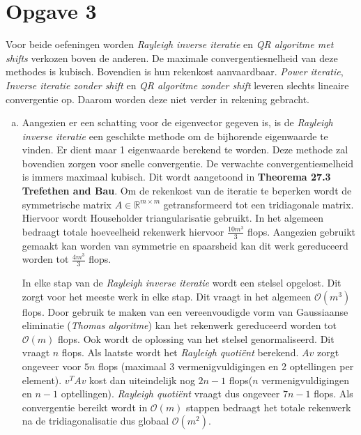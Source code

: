 \documentclass[a4paper]{article}
\newcommand{\opgave}[1]{\section*{Opgave #1}}
\begin{document}
\opgave{3}
Voor beide oefeningen worden \textit{Rayleigh inverse iteratie} en \textit{QR algoritme met shifts} verkozen boven de anderen. De maximale convergentiesnelheid van deze methodes is kubisch. Bovendien is hun rekenkost aanvaardbaar. \textit{Power iteratie}, \textit{Inverse iteratie zonder shift} en \textit{QR algoritme zonder shift} leveren slechts lineaire convergentie op. Daarom worden deze niet verder in rekening gebracht. 
\begin{enumerate}[a)] %
\item 
Aangezien er een schatting voor de eigenvector gegeven is, is de \textit{Rayleigh inverse iteratie} een geschikte methode om de bijhorende eigenwaarde te vinden. Er dient maar 1 eigenwaarde berekend te worden. Deze methode zal bovendien zorgen voor snelle convergentie. De verwachte convergentiesnelheid is immers maximaal kubisch. Dit wordt aangetoond in \textbf{Theorema 27.3 Trefethen and Bau}. Om de rekenkost van de iteratie te beperken wordt de symmetrische matrix $A \in \mathbb{R}^{m\times m}$ getransformeerd tot een tridiagonale matrix. Hiervoor wordt Householder triangularisatie gebruikt. In het algemeen bedraagt totale hoeveelheid rekenwerk hiervoor  $\frac{10m^{3}}{3}$ flops. Aangezien gebruikt gemaakt kan worden van symmetrie en spaarsheid kan dit werk gereduceerd worden tot $\frac{4m^{3}}{3}$ flops. 

In elke stap van de \textit{Rayleigh inverse iteratie} wordt een stelsel opgelost. Dit zorgt voor het meeste werk in elke stap. Dit vraagt in het algemeen $\mathcal{O} (m^3)$ flops. Door gebruik te maken van een vereenvoudigde vorm van Gaussiaanse eliminatie (\textit{Thomas algoritme}) kan het rekenwerk gereduceerd worden tot $\mathcal{O}(m)$ flops. Ook wordt de oplossing van het stelsel genormaliseerd. Dit vraagt $n$ flops. Als laatste wordt het \textit{Rayleigh quoti\"ent} berekend. $Av$ zorgt ongeveer voor $5n$ flops (maximaal 3 vermenigvuldigingen en 2 optellingen per element). $v^{T}Av$ kost dan uiteindelijk nog $2n-1$ flops($n$ vermenigvuldigingen en $n-1$ optellingen). \textit{Rayleigh quoti\"ent} vraagt dus ongeveer $7n-1$ flops. Als convergentie bereikt wordt in $\mathcal{O}(m)$ stappen bedraagt het totale rekenwerk na de tridiagonalisatie dus globaal $\mathcal{O} (m^2)$.


\end{enumerate}
\end{document}
